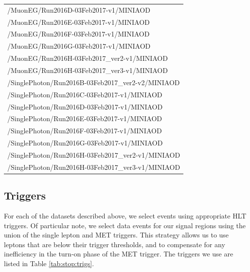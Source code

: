 \begin{table}[htbp]
\begin{tabular}{l}
  /MuonEG/Run2016D-03Feb2017-v1/MINIAOD \\
  /MuonEG/Run2016E-03Feb2017-v1/MINIAOD \\
  /MuonEG/Run2016F-03Feb2017-v1/MINIAOD \\
  /MuonEG/Run2016G-03Feb2017-v1/MINIAOD \\
  /MuonEG/Run2016H-03Feb2017\_ver2-v1/MINIAOD \\
  /MuonEG/Run2016H-03Feb2017\_ver3-v1/MINIAOD \\
\hline
  /SinglePhoton/Run2016B-03Feb2017\_ver2-v2/MINIAOD \\
  /SinglePhoton/Run2016C-03Feb2017-v1/MINIAOD \\
  /SinglePhoton/Run2016D-03Feb2017-v1/MINIAOD \\
  /SinglePhoton/Run2016E-03Feb2017-v1/MINIAOD \\
  /SinglePhoton/Run2016F-03Feb2017-v1/MINIAOD \\
  /SinglePhoton/Run2016G-03Feb2017-v1/MINIAOD \\
  /SinglePhoton/Run2016H-03Feb2017\_ver2-v1/MINIAOD \\
  /SinglePhoton/Run2016H-03Feb2017\_ver3-v1/MINIAOD \\
\hline
\end{tabular}
\end{table}

\subsection{Triggers}
\label{ssec:stop:triggers}

For each of the datasets described above, we select events using
appropriate HLT triggers. Of particular note, we select data events
for our signal regions using the union of the single lepton and MET
triggers. This strategy allows us to use leptons that are below their
trigger thresholds, and to compensate for any inefficiency in the
turn-on phase of the MET trigger. The triggers we use are
listed in Table \ref{tab:stop:trigs}.

